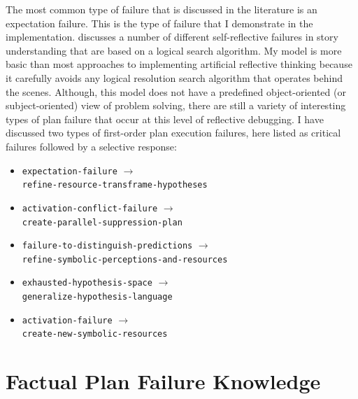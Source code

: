 The most common type of failure that is discussed in the literature is
an expectation failure.  This is the type of failure that I
demonstrate in the implementation.  \cite{cox:2007a} discusses a
number of different self-reflective failures in story understanding
that are based on a logical search algorithm.  My model is more basic
than most approaches to implementing artificial reflective thinking
because it carefully avoids any logical resolution search algorithm
that operates behind the scenes.  Although, this model does not have a
predefined object-oriented (or subject-oriented) view of problem
solving, there are still a variety of interesting types of plan
failure that occur at this level of reflective debugging.  I have
discussed two types of first-order plan execution failures, here
listed as critical failures followed by a selective response:
\begin{itemize}
\item {\tt expectation-failure} $\longrightarrow$ \\
      {\tt refine-resource-transframe-hypotheses}
\item {\tt activation-conflict-failure} $\longrightarrow$ \\
      {\tt create-parallel-suppression-plan}
\item {\tt failure-to-distinguish-predictions} $\longrightarrow$ \\
      {\tt refine-symbolic-perceptions-and-resources}
\item {\tt exhausted-hypothesis-space} $\longrightarrow$ \\
      {\tt generalize-hypothesis-language}
\item {\tt activation-failure} $\longrightarrow$ \\
      {\tt create-new-symbolic-resources}
\end{itemize}

\section{Factual Plan Failure Knowledge}

